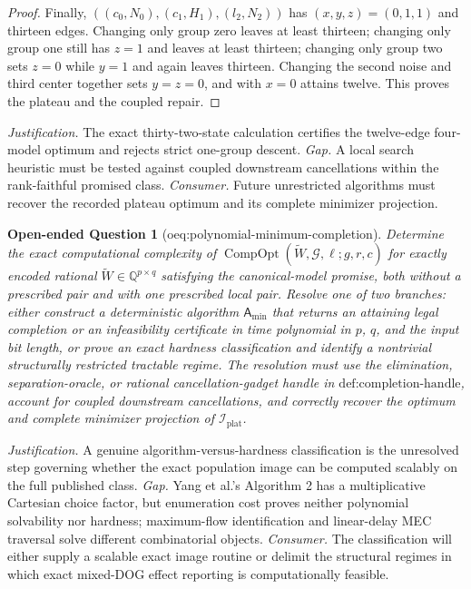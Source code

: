 \documentclass{article}
\newtheorem{openendedquestion}{Open-ended Question}
\begin{document}
\begin{proof}
Finally, \(((c_0,N_0),(c_1,H_1),(l_2,N_2))\) has \((x,y,z)=(0,1,1)\) and thirteen edges. Changing only group zero leaves at least thirteen; changing only group one still has \(z=1\) and leaves at least thirteen; changing only group two sets \(z=0\) while \(y=1\) and again leaves thirteen. Changing the second noise and third center together sets \(y=z=0\), and with \(x=0\) attains twelve. This proves the plateau and the coupled repair.
\end{proof}
\par\smallskip\noindent \textit{Justification.} The exact thirty-two-state calculation certifies the twelve-edge four-model optimum and rejects strict one-group descent. \textit{Gap.} A local search heuristic must be tested against coupled downstream cancellations within the rank-faithful promised class. \textit{Consumer.} Future unrestricted algorithms must recover the recorded plateau optimum and its complete minimizer projection.

\begin{openendedquestion}[oeq:polynomial-minimum-completion]\label{oeq:polynomial-minimum-completion}
Determine the exact computational complexity of \(\operatorname{CompOpt}(\widetilde W,\mathcal G,\ell;g,r,c)\) for exactly encoded rational \(\widetilde W\in\mathbb Q^{p\times q}\) satisfying the canonical-model promise, both without a prescribed pair and with one prescribed local pair. Resolve one of two branches: either construct a deterministic algorithm \(\mathsf A_{\min}\) that returns an attaining legal completion or an infeasibility certificate in time polynomial in \(p\), \(q\), and the input bit length, or prove an exact hardness classification and identify a nontrivial structurally restricted tractable regime. The resolution must use the elimination, separation-oracle, or rational cancellation-gadget handle in \(\text{def:completion-handle}\), account for coupled downstream cancellations, and correctly recover the optimum and complete minimizer projection of \(\mathcal I_{\mathrm{plat}}\).
\end{openendedquestion}
\par\smallskip\noindent \textit{Justification.} A genuine algorithm-versus-hardness classification is the unresolved step governing whether the exact population image can be computed scalably on the full published class. \textit{Gap.} Yang et al.'s Algorithm 2 has a multiplicative Cartesian choice factor, but enumeration cost proves neither polynomial solvability nor hardness; maximum-flow identification and linear-delay MEC traversal solve different combinatorial objects. \textit{Consumer.} The classification will either supply a scalable exact image routine or delimit the structural regimes in which exact mixed-DOG effect reporting is computationally feasible.
\end{document}
